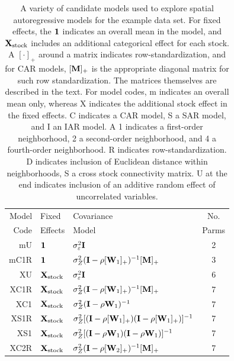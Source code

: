 \documentclass[11pt, titlepage]{article}\usepackage[]{graphicx}\usepackage[]{color}
\begin{document}
\begin{spacing}{1.9}
\begin{flushleft}

\begin{table}[ht]
	\caption{A variety of candidate models used to explore spatial autoregressive models for the example data set.  For fixed effects, the $\mathbf{1}$ indicates an overall mean in the model, and $\mathbf{X}_\textrm{stock}$ includes an additional categorical effect for each stock.  A $[\cdot]_+$ around a matrix indicates row-standardization, and for CAR models, $[\mathbf{M}]_+$ is the appropriate diagonal matrix for such row standardization. The matrices themselves are described in the text. For model codes, m indicates an overall mean only, whereas X indicates the additional stock effect in the fixed effects.  C indicates a CAR model, S a SAR model, and I an IAR model.  A 1 indicates a first-order neighborhood, 2 a second-order neighborhood, and 4 a fourth-order neighborhood.  R indicates row-standardization. D indicates inclusion of Euclidean distance within neighborhoods, S a cross stock connectivity matrix.  U at the end indicates inclusion of an additive random effect of uncorrelated variables.  \label{Tab:Models}}
\begin{center}
\begin{tabular}{r|l|l|c}
  \hline
  \hline
  Model & Fixed & Covariance & No. \\ 
  Code & Effects & Model & Parms \\
  \hline
  mU & $\mathbf{1}$ & $\sigma_\varepsilon^2\mathbf{I}$ & 2 \\
  mC1R & $\mathbf{1}$ & $\sigma_Z^2(\mathbf{I} - \rho[\mathbf{W}_1]_+)^{-1}[\mathbf{M}]_+$ & 3 \\
  XU & $\mathbf{X}_{\textrm{stock}}$ & $\sigma_\varepsilon^2\mathbf{I}$ & 6 \\
  XC1R & $\mathbf{X}_{\textrm{stock}}$ & $\sigma_Z^2(\mathbf{I} - \rho[\mathbf{W}_1]_+)^{-1}[\mathbf{M}]_+$ & 7 \\
  XC1 & $\mathbf{X}_{\textrm{stock}}$ & $\sigma_Z^2(\mathbf{I} - \rho\mathbf{W}_1)^{-1}$ & 7 \\
  XS1R & $\mathbf{X}_{\textrm{stock}}$ & $\sigma_Z^2[(\mathbf{I} - \rho[\mathbf{W}_1]_+)(\mathbf{I} - \rho[\mathbf{W}_1]_+)]^{-1}$ & 7 \\
  XS1 & $\mathbf{X}_{\textrm{stock}}$ & $\sigma_Z^2[(\mathbf{I} - \rho\mathbf{W}_{1})(\mathbf{I} - \rho\mathbf{W}_{1})]^{-1}$ & 7 \\
  XC2R & $\mathbf{X}_{\textrm{stock}}$ & $\sigma_Z^2(\mathbf{I} - \rho[\mathbf{W}_2]_+)^{-1}[\mathbf{M}]_+$ & 7 \\

\end{tabular}
\end{center}
\end{table}
\end{flushleft}
\end{spacing}
\end{document}
